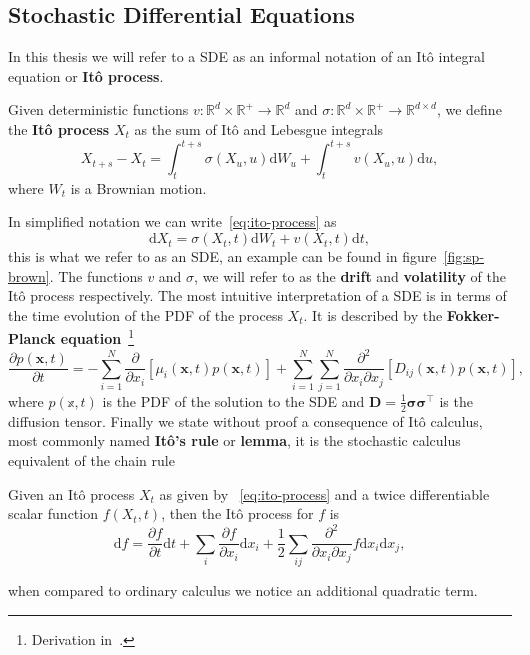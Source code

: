 \subsection{Stochastic Differential Equations}
In this thesis we will refer to a SDE as an informal notation of an It\^ o integral equation or \textbf{It\^ o process}. 
\begin{definition}[It\^ o process]
	Given deterministic functions $v: \mathbb{R}^{d} \times \mathbb{R}^{+} \rightarrow \mathbb{R}^{d}$ and $\sigma: \mathbb{R}^{d} \times \mathbb{R}^{+} \rightarrow \mathbb{R}^{d \times d}$, we define the \textbf{It\^ o process} $X_t$ as the sum of It\^ o and Lebesgue integrals
	\begin{equation}
		\label{eq:ito-process}
		X_{t+s}-X_{t}=\int_{t}^{t+s} \sigma\left(X_{u}, u\right) \mathrm{d} W_{u} + \int_{t}^{t+s} v\left(X_{u}, u\right) \mathrm{d} u,
	\end{equation}
	where $W_t$ is a Brownian motion.
\end{definition}
In simplified notation we can write~\eqref{eq:ito-process} as
\begin{equation}
	\mathrm{d} X_t = \sigma \left(X_{t}, t\right)\mathrm{d}W_t + v\left(X_{t}, t\right) \mathrm{d}t,
\end{equation}
this is what we refer to as an SDE, an example can be found in figure~\ref{fig:sp-brown}. The functions $v$ and $\sigma$, we will refer to as the \textbf{drift} and \textbf{volatility} of the It\^ o process respectively. The most intuitive interpretation of a SDE is in terms of the time evolution of the PDF of the process $X_t$. It is described by the \textbf{Fokker-Planck equation}~\footnote{Derivation in~\cite{sarkka2019applied}.} 
\begin{equation}
	\frac{\partial p(\mathbf{x}, t)}{\partial t}=
	-\sum_{i=1}^{N} \frac{\partial}{\partial x_{i}}\left[\mu_{i}(\mathbf{x}, t) p(\mathbf{x}, t)\right]
	+\sum_{i=1}^{N} \sum_{j=1}^{N} \frac{\partial^{2}}{\partial x_{i} \partial x_{j}}\left[D_{i j}(\mathbf{x}, t) p(\mathbf{x}, t)\right],
\end{equation}
where $p(\mathbb{x}, t)$ is the PDF of the solution to the SDE and $\mathbf{D}=\frac{1}{2} \boldsymbol{\sigma} \boldsymbol{\sigma}^{\top}$ is the diffusion tensor. Finally we state without proof a consequence of It\^ o calculus, most commonly named \textbf{It\^ o's rule} or \textbf{lemma}, it is the stochastic calculus equivalent of the chain rule
\begin{lemma}[It\^ o's lemma]
	Given an It\^ o process $X_t$ as given by ~\eqref{eq:ito-process} and a twice differentiable scalar function $f(X_t, t)$, then the It\^ o process for $f$ is
	\begin{equation}
		\mathrm{d} f = \frac{\partial f}{\partial t}\mathrm{d}t + \sum_i \frac{\partial f}{\partial x_i} \mathrm{d}x_i + \frac{1}{2}\sum_{ij} \frac{\partial^{2}}{\partial x_{i} \partial x_{j}} f \mathrm{d}x_i \mathrm{d}x_j,
	\end{equation}
\end{lemma}
when compared to ordinary calculus we notice an additional quadratic term.

